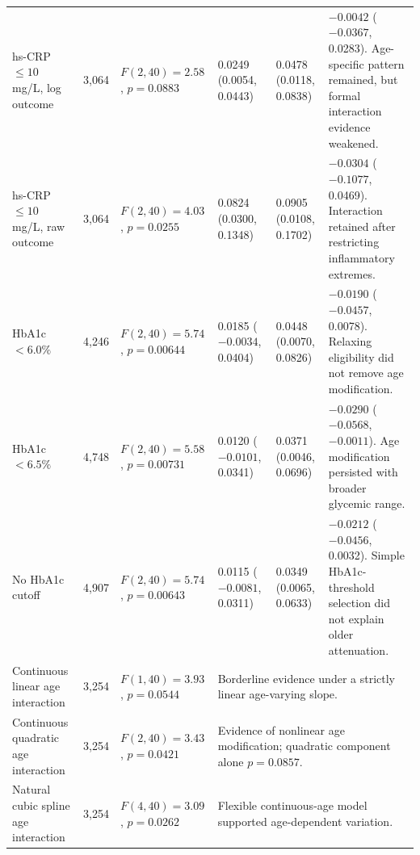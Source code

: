 \begin{landscape}
\begin{table}[p]
\begin{threeparttable}
\begin{tabular}{p{3.1cm} p{2.0cm} p{2.8cm} p{2.8cm} p{2.8cm} p{3.4cm}}
\addlinespace

hs-CRP $\leq10$ mg/L, log outcome &
3,064 &
$F(2,40)=2.58$, $p=0.0883$ &
0.0249 (0.0054, 0.0443) &
0.0478 (0.0118, 0.0838) &
$-0.0042$ ($-0.0367$, 0.0283).
Age-specific pattern remained, but formal interaction evidence weakened. \\

\addlinespace

hs-CRP $\leq10$ mg/L, raw outcome &
3,064 &
$F(2,40)=4.03$, $p=0.0255$ &
0.0824 (0.0300, 0.1348) &
0.0905 (0.0108, 0.1702) &
$-0.0304$ ($-0.1077$, 0.0469).
Interaction retained after restricting inflammatory extremes. \\

\addlinespace

HbA1c $<6.0\%$ &
4,246 &
$F(2,40)=5.74$, $p=0.00644$ &
0.0185 ($-0.0034$, 0.0404) &
0.0448 (0.0070, 0.0826) &
$-0.0190$ ($-0.0457$, 0.0078).
Relaxing eligibility did not remove age modification. \\

\addlinespace

HbA1c $<6.5\%$ &
4,748 &
$F(2,40)=5.58$, $p=0.00731$ &
0.0120 ($-0.0101$, 0.0341) &
0.0371 (0.0046, 0.0696) &
$-0.0290$ ($-0.0568$, $-0.0011$).
Age modification persisted with broader glycemic range. \\

\addlinespace

No HbA1c cutoff\tnote{b} &
4,907 &
$F(2,40)=5.74$, $p=0.00643$ &
0.0115 ($-0.0081$, 0.0311) &
0.0349 (0.0065, 0.0633) &
$-0.0212$ ($-0.0456$, 0.0032).
Simple HbA1c-threshold selection did not explain older attenuation. \\

\addlinespace

Continuous linear age interaction &
3,254 &
$F(1,40)=3.93$, $p=0.0544$ &
\multicolumn{3}{l}{Borderline evidence under a strictly linear age-varying slope.} \\

\addlinespace

Continuous quadratic age interaction &
3,254 &
$F(2,40)=3.43$, $p=0.0421$ &
\multicolumn{3}{l}{Evidence of nonlinear age modification; quadratic component alone $p=0.0857$.} \\

\addlinespace

Natural cubic spline age interaction &
3,254 &
$F(4,40)=3.09$, $p=0.0262$ &
\multicolumn{3}{l}{Flexible continuous-age model supported age-dependent variation.} \\


\end{tabular}
\end{threeparttable}
\end{table}
\end{landscape}
